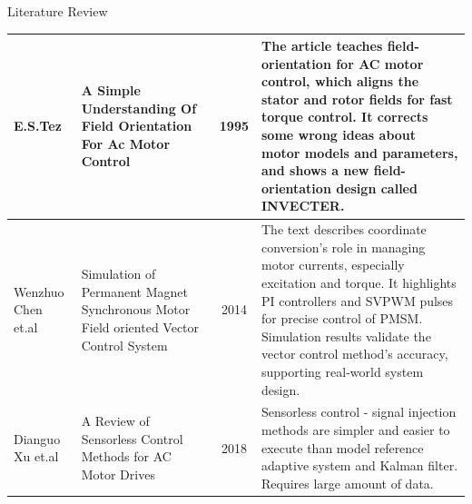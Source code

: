 \begin{frame}{Literature Review}
\begin{center}
\begin{table}
\begin{tabular}{|p{1.4cm}|p{}|c|p{6cm}|}
				\hline
				\vspace{0.005in} E.S.Tez                   & \vspace{0.005in} A Simple Understanding Of Field Orientation For Ac Motor Control                       & \vspace{0.01in} 1995             & \vspace{0.005in} \RaggedRight The article teaches field-orientation for AC motor control, which aligns the stator and rotor fields for fast torque control. It corrects some wrong ideas about motor models and parameters, and shows a new field-orientation design called INVECTER.                                                                                             \\
				\hline
				\vspace{0.1in}
				\vspace{0.005in}  Wenzhuo Chen et.al       & \vspace{0.005in}  Simulation of Permanent Magnet Synchronous Motor Field oriented Vector Control System & 2014                             & \vspace{0.04in} \RaggedRight The text describes coordinate conversion's role in managing motor currents, especially excitation and torque. It highlights PI controllers and SVPWM pulses for precise control of PMSM. Simulation results validate the vector control method's accuracy, supporting real-world system design.\vspace{0.04in}                                       \\
				\hline
				\vspace{0.005in}  Dianguo Xu  et.al        & \vspace{0.005in}  A Review of Sensorless Control Methods for AC Motor Drives                            & 2018                             & \vspace{0.04in} \RaggedRight Sensorless control - signal injection methods are simpler and easier to execute than model reference adaptive system and Kalman filter. Requires large amount of data. \vspace{0.04in}                                                                                                                                                               \\
				\hline


\end{tabular}
\end{table}
\end{center}
\end{frame}
